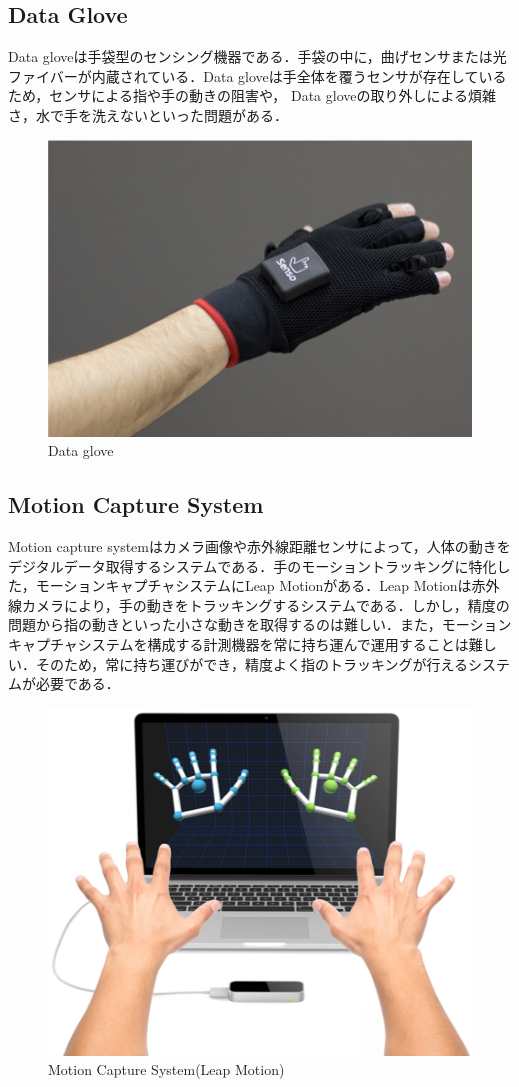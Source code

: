 \subsection*{Data Glove}
Data gloveは手袋型のセンシング機器である．手袋の中に，曲げセンサまたは光ファイバーが内蔵されている．Data gloveは手全体を覆うセンサが存在しているため，センサによる指や手の動きの阻害や，
Data gloveの取り外しによる煩雑さ，水で手を洗えないといった問題がある．

\begin{figure}[H]
  \centering
  \includegraphics[width=0.6\linewidth]{fig/ch1/dataglove}
  \caption{Data glove}
  \label{fig:Data glove}
\end{figure}

\subsection*{Motion Capture System}
Motion capture systemはカメラ画像や赤外線距離センサによって，人体の動きをデジタルデータ取得するシステムである．手のモーショントラッキングに特化した，モーションキャプチャシステムにLeap Motionがある．Leap Motionは赤外線カメラにより，手の動きをトラッキングするシステムである．しかし，精度の問題から指の動きといった小さな動きを取得するのは難しい．また，モーションキャプチャシステムを構成する計測機器を常に持ち運んで運用することは難しい．そのため，常に持ち運びができ，精度よく指のトラッキングが行えるシステムが必要である．


\begin{figure}[H]
  \centering
  \includegraphics[width=0.6\linewidth]{fig/mcs}
  \caption{Motion Capture System(Leap Motion)}
  \label{fig:Motion Capture System}
\end{figure}


